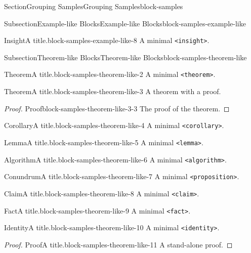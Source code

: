 \documentclass[twoside,10pt,]{article}
\newcommand{\mono}[1]{\texttt{#1}}
\numberwithin{equation}{section}
\begin{document}
\begin{sectionptx}{Section}{Grouping Samples}{}{Grouping Samples}{}{}{block-samples}
\begin{subsectionptx}{Subsection}{Example-like Blocks}{}{Example-like Blocks}{}{}{block-samples-example-like}
\begin{insight}{Insight}{A title.}{block-samples-example-like-8}
A minimal \mono{<insight>}.%
\end{insight}
\end{subsectionptx}
%
%
\typeout{************************************************}
\typeout{************************************************}
%
\begin{subsectionptx}{Subsection}{Theorem-like Blocks}{}{Theorem-like Blocks}{}{}{block-samples-theorem-like}
\begin{theorem}{Theorem}{A title.}{}{block-samples-theorem-like-2}%
A minimal \mono{<theorem>}.%
\end{theorem}
\begin{theorem}{Theorem}{A title.}{}{block-samples-theorem-like-3}%
A theorem with a proof.%
\end{theorem}
\begin{proof}{Proof}{}{block-samples-theorem-like-3-3}
The proof of the theorem.%
\end{proof}
\begin{corollary}{Corollary}{A title.}{}{block-samples-theorem-like-4}%
A minimal \mono{<corollary>}.%
\end{corollary}
\begin{lemma}{Lemma}{A title.}{}{block-samples-theorem-like-5}%
A minimal \mono{<lemma>}.%
\end{lemma}
\begin{algorithm}{Algorithm}{A title.}{}{block-samples-theorem-like-6}%
A minimal \mono{<algorithm>}.%
\end{algorithm}
\begin{proposition}{Conundrum}{A title.}{}{block-samples-theorem-like-7}%
A minimal \mono{<proposition>}.%
\end{proposition}
\begin{claim}{Claim}{A title.}{}{block-samples-theorem-like-8}%
A minimal \mono{<claim>}.%
\end{claim}
\begin{fact}{Fact}{A title.}{}{block-samples-theorem-like-9}%
A minimal \mono{<fact>}.%
\end{fact}
\begin{identity}{Identity}{A title.}{}{block-samples-theorem-like-10}%
A minimal \mono{<identity>}.%
\end{identity}
\begin{proof}{Proof}{A title.}{block-samples-theorem-like-11}
A stand-alone proof.%
\end{proof}
\end{subsectionptx}
%
%
\typeout{************************************************}

\end{sectionptx}
\end{document}
